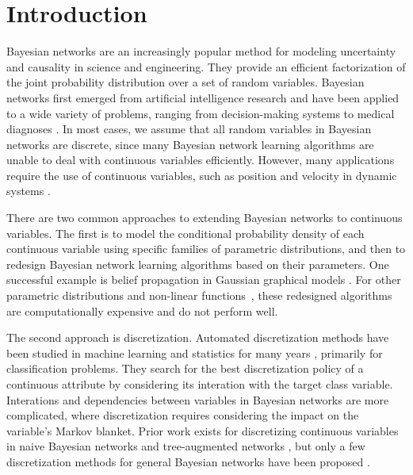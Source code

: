 \section{Introduction}
\label{intro}
Bayesian networks \citep{Pearl_1988, PGM_2009} are an increasingly popular method for modeling uncertainty and causality in science and engineering. They provide an efficient factorization of the joint probability distribution over a set of random variables. Bayesian networks first emerged from artificial intelligence research and have been applied to a wide variety of problems, ranging from decision-making systems \citep{DMU_2015} to medical diagnoses \citep{Lustgarten_2011}. In most cases, we assume that all random variables in Bayesian networks are discrete, since many Bayesian network learning algorithms are unable to deal with continuous variables efficiently. However, many applications
require the use of continuous variables, such as position and velocity in dynamic systems .

There are two common approaches to extending Bayesian networks to continuous variables.
The first is to model the conditional probability density of each continuous variable using specific families of parametric distributions, and then to redesign Bayesian network learning algorithms based on their parameters.
One successful example is belief propagation in Gaussian graphical models \citep{Weiss_2011}.
For other parametric distributions \citep{Ihler_2009} and non-linear functions~\todo{[cite]}, these redesigned algorithms are computationally expensive and do not perform well.

The second approach is discretization.
Automated discretization methods have been studied in machine learning and statistics for many years \citep{Dougherty_1995, Kerber_1992, Holte_1993, Fayyad_1993}, primarily for classification problems.
They search for the best discretization policy of a continuous attribute by considering its interation with the target class variable.
Interations and dependencies between variables in Bayesian networks are more complicated, where discretization requires considering the impact on the variable's Markov blanket.
Prior work exists for discretizing continuous variables in naive Bayesian networks and tree-augmented networks \citep{Fried_naive}, but only a few discretization methods for general Bayesian networks have been proposed \citep{Friedman_1996, Kozlov_1997, Monti_1998, Steck_2007}.

